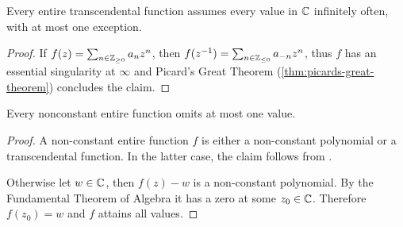 \begin{corollary} \label{cor:transcendental-every-value-inf}
    Every entire transcendental function assumes every value in $\mathbb{C}$ infinitely often, with at most one exception.
\end{corollary}

\begin{proof}
    If $f(z) = \sum_{n \in \mathbb{Z}_{\geq 0}} a_n z^n$, then $f(z^{-1}) = \sum_{n \in \mathbb{Z}_{\leq 0}} a_{-n} z^{n}$, thus $f$ has an essential singularity at $\infty$ and Picard's Great Theorem (\ref{thm:picards-great-theorem}) concludes the claim.
\end{proof}

\begin{corollary} \label{thm:picards-little-theorem}
    Every nonconstant entire function omits at most one value.
\end{corollary}

\begin{proof}
    A non-constant entire function $f$ is either a non-constant polynomial or a transcendental function. In the latter case, the claim follows from .
    
    Otherwise let $w \in \mathbb{C}$, then $f(z) - w$ is a non-constant polynomial. By the Fundamental Theorem of Algebra it has a zero at some $z_0 \in \mathbb{C}$. Therefore $f(z_0) = w$ and $f$ attains all values.
\end{proof}
